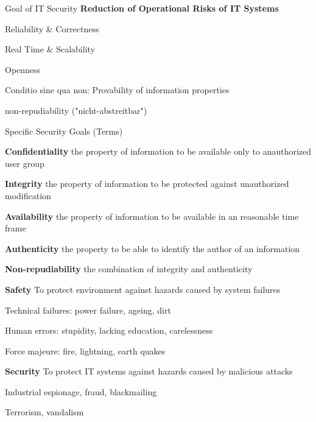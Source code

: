 \documentclass[a4paper]{article}
\begin{document}
\raggedright
\begin{multicols}{3}\scriptsize
    \setlength{\premulticols}{1pt}
    \setlength{\postmulticols}{1pt}
    \setlength{\multicolsep}{1pt}
    \setlength{\columnsep}{2pt}

    Goal of IT Security \textbf{Reduction of Operational Risks of IT Systems}
    \begin{itemize*}
        \item Reliability \& Correctness
        \item Real Time \& Scalability
        \item Openness
        \item Conditio sine qua non: Provability of information properties
        \item non-repudiability ("nicht-abstreitbar")
    \end{itemize*}

    Specific Security Goals (Terms)
    \begin{itemize*}
        \item \textbf{Confidentiality} the property of information to be available only to anauthorized user group
        \item \textbf{Integrity} the property of information to be protected against unauthorized modification
        \item \textbf{Availability} the property of information to be available in an reasonable time frame
        \item \textbf{Authenticity} the property to be able to identify the author of an information
        \item \textbf{Non-repudiability} the combination of integrity and authenticity
        \item \textbf{Safety} To protect environment against hazards caused by system failures
        \begin{itemize*}
            \item Technical failures: power failure, ageing, dirt
            \item Human errors: stupidity, lacking education, carelessness
            \item Force majeure: fire, lightning, earth quakes
        \end{itemize*}
        \item \textbf{Security} To protect IT systems against hazards caused by malicious attacks
        \begin{itemize*}
            \item Industrial espionage, fraud, blackmailing
            \item Terrorism, vandalism
        \end{itemize*}
    \end{itemize*}


\end{multicols}
\end{document}
